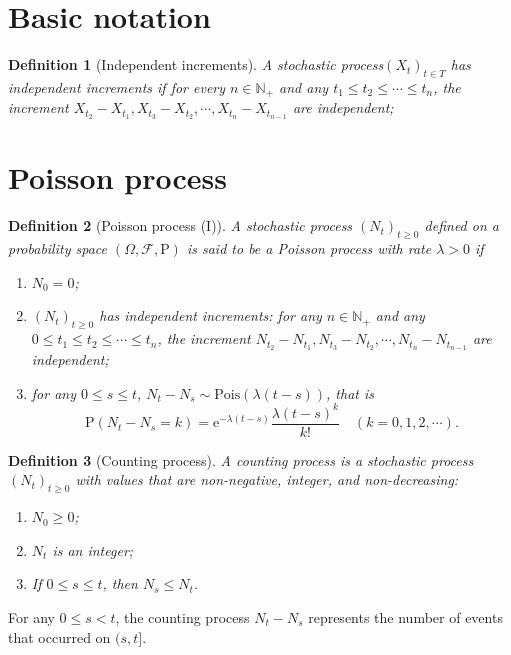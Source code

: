 \documentclass{article}
\newtheorem{definition}{Definition}[section]
\begin{document}
\section{Basic notation}
\begin{definition}[Independent increments]
  A stochastic process$(X_t)_{t\in T}$ has \emph{independent increments} if for every $n\in \mathbb{N}_+$ and any $t_1\le t_2 \le\cdots\le t_n$, the increment $X_{t_2}-X_{t_1},X_{t_3}-X_{t_2},\cdots,X_{t_n}-X_{t_{n-1}}$ are independent;
\end{definition}



\section{Poisson process}
\begin{definition}[Poisson process (I)]
	A stochastic process $(N_t)_{t\ge0}$ defined on a probability space $(\Omega,\mathcal{F},\mathrm{P})$ is said to be a \emph{Poisson process} with rate $\lambda>0$ if
	\begin{enumerate}
		\item $N_0=0$;
		\item $(N_t)_{t\ge0}$ has independent increments: for any $n\in \mathbb{N}_+$ and any $0\le t_1\le t_2 \le\cdots\le t_n$, the increment $N_{t_2}-N_{t_1},N_{t_3}-N_{t_2},\cdots,N_{t_n}-N_{t_{n-1}}$ are independent;
		\item for any $0\le s \le t$, $N_t-N_s\sim \mathrm{Pois}(\lambda(t-s))$, that is 
		\[
		\mathrm{P}(N_t-N_s=k)=\mathrm{e}^{-\lambda(t-s)}\dfrac{\lambda(t-s)^k}{k!}\quad(k=0,1,2,\cdots).
		\]
	\end{enumerate}	
\end{definition}

\begin{definition}[Counting process]
	A \emph{counting process} is a stochastic process $(N_t)_{t\ge 0}$ with values that are non-negative, integer, and non-decreasing:
	\begin{enumerate}
		\item $N_0\ge0$;
		\item $N_t$ is an integer;
		\item If $0\le s\le t$, then $N_s \le N_t$.
	\end{enumerate}	
		
\end{definition}
For any $0\le s<t$, the counting process $N_t-N_s$ represents the number of events that occurred on $(s,t]$.  
\end{document}

